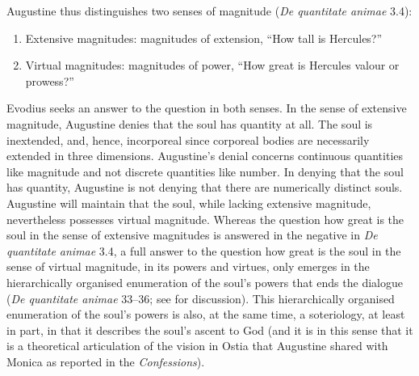 \documentclass[12pt]{article}
\begin{document}
Augustine thus distinguishes two senses of magnitude (\emph{De quantitate animae} 3.4):
\begin{enumerate}
	\item Extensive magnitudes: magnitudes of extension, “How tall is Hercules?”
	\item Virtual magnitudes: magnitudes of power, “How great is Hercules valour or prowess?”
\end{enumerate}
Evodius seeks an answer to the question in both senses. In the sense of extensive magnitude, Augustine denies that the soul has quantity at all. The soul is inextended, and, hence, incorporeal since corporeal bodies are necessarily extended in three dimensions. Augustine's denial concerns continuous quantities like magnitude and not discrete quantities like number. In denying that the soul has quantity, Augustine is not denying that there are numerically distinct souls. Augustine will maintain that the soul, while lacking extensive magnitude, nevertheless possesses virtual magnitude. Whereas the question how great is the soul in the sense of extensive magnitudes is answered in the negative in \emph{De quantitate animae} 3.4, a full answer to the question how great is the soul in the sense of virtual magnitude, in its powers and virtues, only emerges in the hierarchically organised enumeration of the soul’s powers that ends the dialogue (\emph{De quantitate animae} 33–36; see \citealt{Brittain2003-BRICA-2} for discussion). This hierarchically organised enumeration of the soul’s powers is also, at the same time, a soteriology, at least in part, in that it describes the soul’s ascent to God (and it is in this sense that it is a theoretical articulation of the vision in Ostia that Augustine shared with Monica as reported in the \emph{Confessions}).
\end{document}
